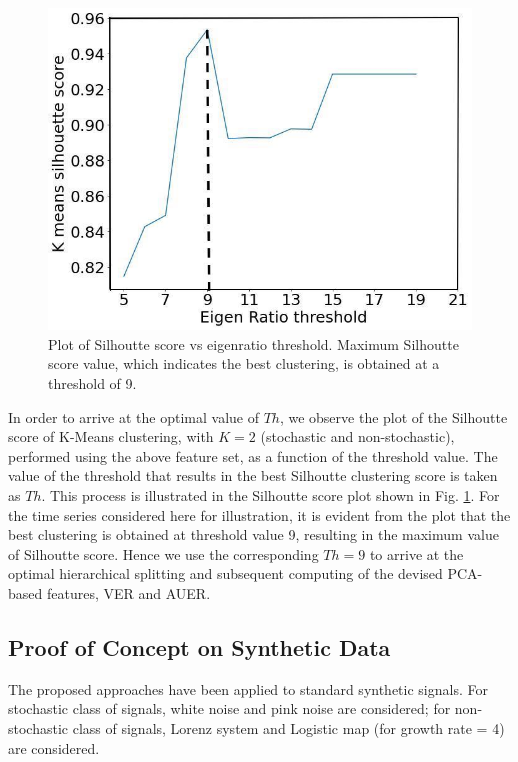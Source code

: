 \documentclass[journal]{IEEEtran}
\begin{document}
		\begin{figure}[ht]
		\centering
		\includegraphics[width=0.7\linewidth]{threshold.jpg}
		\caption{Plot of Silhoutte score vs eigenratio threshold. Maximum Silhoutte score value, which indicates the best clustering, is obtained at a threshold of 9.}
		\label{sill}
	\end{figure}


	In order to arrive at the optimal value of $Th$, we observe  the plot of the Silhoutte score of K-Means clustering, with $K=2$ (stochastic and non-stochastic), performed using the above feature set, as a function of the threshold value. The value of the threshold that results in the best Silhoutte clustering score is taken as $Th$. This process is illustrated in the Silhoutte score plot shown in Fig. \ref{sill}. For the time series considered here for illustration, it is evident from the plot that the best clustering is obtained at threshold value 9, resulting in the maximum value of Silhoutte score. Hence we use the corresponding $Th = 9$ to arrive at the optimal hierarchical splitting and subsequent computing of the devised PCA-based features, VER and AUER.

	\subsection{Proof of Concept on Synthetic Data}
	The proposed approaches have been applied to standard synthetic signals. For stochastic class of signals, white noise and pink noise are considered; for non-stochastic class of signals, Lorenz system and Logistic map (for growth rate = 4) are considered.
	
\end{document}

